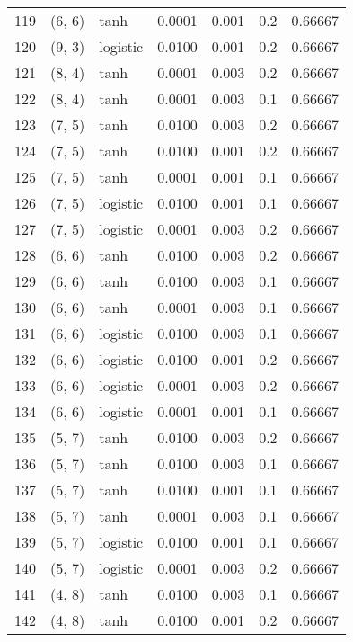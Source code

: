 \begin{tabular}{lllrrrr}
119 &      (6, 6) &      tanh &  0.0001 &  0.001 &  0.2 &   0.66667 \\
120 &      (9, 3) &  logistic &  0.0100 &  0.001 &  0.2 &   0.66667 \\
121 &      (8, 4) &      tanh &  0.0001 &  0.003 &  0.2 &   0.66667 \\
122 &      (8, 4) &      tanh &  0.0001 &  0.003 &  0.1 &   0.66667 \\
123 &      (7, 5) &      tanh &  0.0100 &  0.003 &  0.2 &   0.66667 \\
124 &      (7, 5) &      tanh &  0.0100 &  0.001 &  0.2 &   0.66667 \\
125 &      (7, 5) &      tanh &  0.0001 &  0.001 &  0.1 &   0.66667 \\
126 &      (7, 5) &  logistic &  0.0100 &  0.001 &  0.1 &   0.66667 \\
127 &      (7, 5) &  logistic &  0.0001 &  0.003 &  0.2 &   0.66667 \\
128 &      (6, 6) &      tanh &  0.0100 &  0.003 &  0.2 &   0.66667 \\
129 &      (6, 6) &      tanh &  0.0100 &  0.003 &  0.1 &   0.66667 \\
130 &      (6, 6) &      tanh &  0.0001 &  0.003 &  0.1 &   0.66667 \\
131 &      (6, 6) &  logistic &  0.0100 &  0.003 &  0.1 &   0.66667 \\
132 &      (6, 6) &  logistic &  0.0100 &  0.001 &  0.2 &   0.66667 \\
133 &      (6, 6) &  logistic &  0.0001 &  0.003 &  0.2 &   0.66667 \\
134 &      (6, 6) &  logistic &  0.0001 &  0.001 &  0.1 &   0.66667 \\
135 &      (5, 7) &      tanh &  0.0100 &  0.003 &  0.2 &   0.66667 \\
136 &      (5, 7) &      tanh &  0.0100 &  0.003 &  0.1 &   0.66667 \\
137 &      (5, 7) &      tanh &  0.0100 &  0.001 &  0.1 &   0.66667 \\
138 &      (5, 7) &      tanh &  0.0001 &  0.003 &  0.1 &   0.66667 \\
139 &      (5, 7) &  logistic &  0.0100 &  0.001 &  0.1 &   0.66667 \\
140 &      (5, 7) &  logistic &  0.0001 &  0.003 &  0.2 &   0.66667 \\
141 &      (4, 8) &      tanh &  0.0100 &  0.003 &  0.1 &   0.66667 \\
142 &      (4, 8) &      tanh &  0.0100 &  0.001 &  0.2 &   0.66667 \\

\end{tabular}
